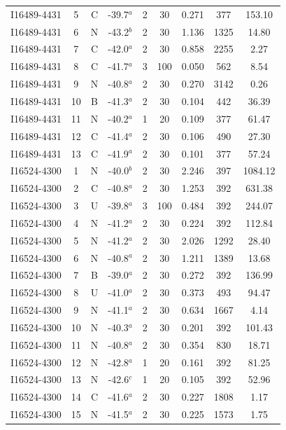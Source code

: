 \begin{table}
\begin{tabular}{ccccccccc}
I16489-4431 & 5 & C & -39.7$^{a}$ & 2 & 30 & 0.271 & 377 & 153.10 \\
I16489-4431 & 6 & N & -43.2$^{b}$ & 2 & 30 & 1.136 & 1325 & 14.80 \\
I16489-4431 & 7 & C & -42.0$^{a}$ & 2 & 30 & 0.858 & 2255 & 2.27 \\
I16489-4431 & 8 & C & -41.7$^{a}$ & 3 & 100 & 0.050 & 562 & 8.54 \\
I16489-4431 & 9 & N & -40.8$^{a}$ & 2 & 30 & 0.270 & 3142 & 0.26 \\
I16489-4431 & 10 & B & -41.3$^{a}$ & 2 & 30 & 0.104 & 442 & 36.39 \\
I16489-4431 & 11 & N & -40.2$^{a}$ & 1 & 20 & 0.109 & 377 & 61.47 \\
I16489-4431 & 12 & C & -41.4$^{a}$ & 2 & 30 & 0.106 & 490 & 27.30 \\
I16489-4431 & 13 & C & -41.9$^{a}$ & 2 & 30 & 0.101 & 377 & 57.24 \\
I16524-4300 & 1 & N & -40.0$^{b}$ & 2 & 30 & 2.246 & 397 & 1084.12 \\
I16524-4300 & 2 & C & -40.8$^{a}$ & 2 & 30 & 1.253 & 392 & 631.38 \\
I16524-4300 & 3 & U & -39.8$^{a}$ & 3 & 100 & 0.484 & 392 & 244.07 \\
I16524-4300 & 4 & N & -41.2$^{a}$ & 2 & 30 & 0.224 & 392 & 112.84 \\
I16524-4300 & 5 & N & -41.2$^{a}$ & 2 & 30 & 2.026 & 1292 & 28.40 \\
I16524-4300 & 6 & N & -40.8$^{a}$ & 2 & 30 & 1.211 & 1389 & 13.68 \\
I16524-4300 & 7 & B & -39.0$^{a}$ & 2 & 30 & 0.272 & 392 & 136.99 \\
I16524-4300 & 8 & U & -41.0$^{a}$ & 2 & 30 & 0.373 & 493 & 94.47 \\
I16524-4300 & 9 & N & -41.1$^{a}$ & 2 & 30 & 0.634 & 1667 & 4.14 \\
I16524-4300 & 10 & N & -40.3$^{a}$ & 2 & 30 & 0.201 & 392 & 101.43 \\
I16524-4300 & 11 & N & -40.8$^{a}$ & 2 & 30 & 0.354 & 830 & 18.71 \\
I16524-4300 & 12 & N & -42.8$^{a}$ & 1 & 20 & 0.161 & 392 & 81.25 \\
I16524-4300 & 13 & N & -42.6$^{c}$ & 1 & 20 & 0.105 & 392 & 52.96 \\
I16524-4300 & 14 & C & -41.6$^{a}$ & 2 & 30 & 0.227 & 1808 & 1.17 \\
I16524-4300 & 15 & N & -41.5$^{a}$ & 2 & 30 & 0.225 & 1573 & 1.75 \\

\end{tabular}
\end{table}
